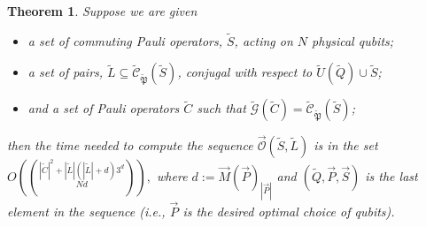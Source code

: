 \documentclass[12pt]{amsbook}
\theoremstyle{plain}
\newtheorem{theorem}{Theorem}
\theoremstyle{definition}
\theoremstyle{remark}
\newcommand{\lst}{\vec}
\newcommand{\set}{\tilde}
\newcommand{\genfun}{\tilde{\mathcal{G}}}
\newcommand{\pauligroup}{{\set{\mathfrak{P}}}}
\newcommand{\centralizer}{\set{\mathcal{C}}}
\newcommand{\optimizer}{\lst{\mathcal{O}}}
\newcommand{\paren}[1]{\left(#1\right)}
\begin{document}
\begin{theorem}
\label{theorem:bound on running time}
Suppose we are given
\begin{itemize}
\item a set of commuting Pauli operators, $\set S$, acting on $N$ physical qubits;
\item a set of pairs, $\set L\subseteq\centralizer_\pauligroup(\set S)$, conjugal with respect to $\set U(\set Q)\cup\set S$;
\item and a set of Pauli operators $\set C$ such that $\genfun(\set C)=\centralizer_\pauligroup(\set S)$;
\end{itemize}
then the time needed to compute the sequence $\optimizer(\set S,\set L)$ is in the set $O\paren{|\set C|^2+|\set L|(|\set L|+d)3^d\choose{N}{d}},$ where $d:=\lst M(\lst P)_{|\lst P|}$ and $(\set Q,\lst P,\lst S)$ is the last element in the sequence (i.e., $\lst P$ is the desired optimal choice of qubits).
\end{theorem}
\end{document}
